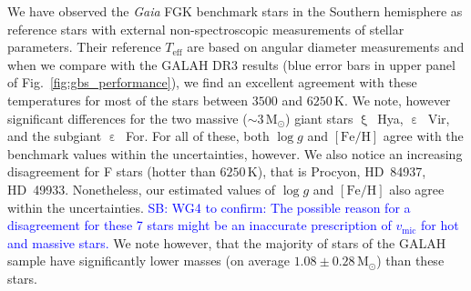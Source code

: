 \documentclass[fleqn,usenatbib,useAMS]{mnras}
\newcommand{\Teff}{$T_\mathrm{eff}$\xspace}
\newcommand{\logg}{$\log g$\xspace}
\newcommand{\feh}{$\mathrm{[Fe/H]}$\xspace}
\newcommand{\vmic}{$v_\mathrm{mic}$\xspace}
\newcommand{\Gaia}{\textit{Gaia}\xspace}
\newcommand\SB[1]{\textcolor{blue}{SB: #1}}
\begin{document}
We have observed the \Gaia FGK benchmark stars \citep[GBS][]{Heiter2015, Jofre2014, Jofre2015, Hawkins2016, Jofre2018a} in the Southern hemisphere as reference stars with external non-spectroscopic measurements of stellar parameters. Their reference \Teff are based on angular diameter measurements and when we compare with the GALAH DR3 results (blue error bars in upper panel of Fig.~\ref{fig:gbs_performance}), we find an excellent agreement with these temperatures for most of the stars between $3500$ and $6250\,\mathrm{K}$. We note, however significant differences for the two massive ($\sim 3\,\mathrm{M_\odot}$) giant stars $\upxi$~Hya, $\upepsilon$~Vir, and the subgiant $\upepsilon$~For. For all of these, both \logg and \feh agree with the benchmark values within the uncertainties, however. We also notice an increasing disagreement for F stars (hotter than $6250\,\mathrm{K}$), that is Procyon, HD~84937, HD~49933. Nonetheless, our estimated values of \logg and \feh also agree within the uncertainties. \SB{WG4 to confirm: The possible reason for a disagreement for these 7 stars might be an inaccurate prescription of \vmic for hot and massive stars.} We note however, that the majority of stars of the GALAH sample have significantly lower masses (on average $1.08\pm0.28\,\mathrm{M_\odot}$) than these stars.
\end{document}
